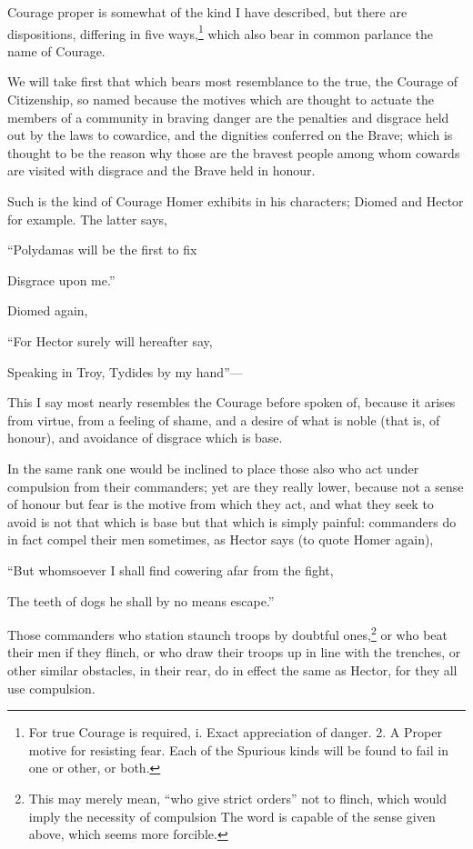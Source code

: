 Courage proper is somewhat of the kind I have described, but there are
dispositions, differing in five ways,\footnote{For true Courage is required, i. Exact appreciation of danger. 2. A Proper
motive for resisting fear. Each of the Spurious kinds will be found to fail in
one or other, or both.}
which also bear in common parlance the name of Courage.

We will take first that which bears most resemblance to the true, the Courage
of Citizenship, so named because the motives which are thought to actuate the
members of a community in braving danger are the penalties and disgrace held
out by the laws to cowardice, and the dignities conferred on the Brave; which
is thought to be the reason why those are the bravest people among whom cowards
are visited with disgrace and the Brave held in honour.

Such is the kind of Courage Homer exhibits in his characters; Diomed and Hector
for example. The latter says,

“Polydamas will be the first to fix

Disgrace upon me.”

Diomed again,

“For Hector surely will hereafter say,

Speaking in Troy, Tydides by my hand”—

This I say most nearly resembles the Courage before spoken of, because it
arises from virtue, from a feeling of shame, and a desire of what is noble
(that is, of honour), and avoidance of disgrace which is base.

In the same rank one would be inclined to place those also who act under
compulsion from their commanders; yet are they really lower, because not a
sense of honour but fear is the motive from which they act, and what they seek
to avoid is not that which is base but that which is simply painful: commanders
do in fact compel their men sometimes, as Hector says (to quote Homer again),

“But whomsoever I shall find cowering afar from the fight,

The teeth of dogs he shall by no means escape.”

Those commanders who station staunch troops by doubtful ones,\footnote{This may merely mean, “who give strict orders” not to flinch, which
would imply the necessity of compulsion The word is capable of the sense given
above, which seems more forcible.}
or who beat their men if they flinch, or who draw their troops up in line with
the trenches, or other similar obstacles, in their rear, do in effect the same
as Hector, for they all use compulsion.

